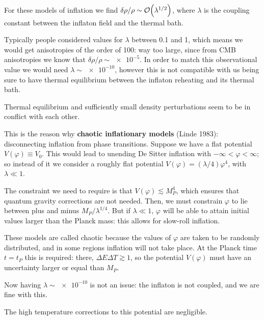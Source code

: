 \documentclass[main.tex]{subfiles}
\begin{document}


For these models of inflation we find \(\delta \rho / \rho \sim \order{\lambda^{1/2}}\), where \(\lambda \) is the coupling constant between the inflaton field and the thermal bath.

Typically people considered values for \(\lambda \) between \num{.1} and \num{1}, which means we would get anisotropies of the order of 100:
way too large, since from CMB anisotropies we know that \(\delta \rho / \rho \sim \num{e-5}\).
In order to match this observational value we would need \(\lambda \sim \num{e-10}\), however this is not compatible with us being sure to have thermal equilibrium between the inflaton reheating and its thermal bath. 

Thermal equilibrium and sufficiently small density perturbations seem to be in conflict with each other. 

This is the reason why \textbf{chaotic inflationary models} (Linde 1983): disconnecting inflation from phase transitions. 
Suppose we have a flat potential \(V(\varphi ) \equiv V_0 \). 
This would lead to unending De Sitter inflation with \(- \infty < \varphi < \infty \); so instead of it we consider a roughly flat potential \(V(\varphi ) = (\lambda /4) \varphi^{4}\), with \(\lambda \ll 1\). 

The constraint we need to require is that \(V(\varphi ) \lesssim M_P^{4}\), which ensures that quantum gravity corrections are not needed.
Then, we must constrain \(\varphi \) to lie between plus and minus \(M_P / \lambda^{1/4}\). 
But if \(\lambda \ll 1\), \(\varphi \) will be able to attain initial values larger than the Planck mass: this allows for slow-roll inflation. 

These models are called chaotic because the values of \(\varphi \) are taken to be randomly distributed, and in some regions inflation will not take place. 
At the Planck time \(t = t_P\) this is required: there, \(\Delta E \Delta T \gtrsim 1\), so the potential \(V(\varphi )\) must have an uncertainty larger or equal than \(M_P\). 

Now having \(\lambda \sim \num{e-10}\) is not an issue: the inflaton is not coupled, and we are fine with this. 

The high temperature corrections to this potential are negligible.
\end{document}
